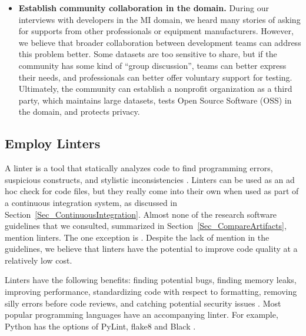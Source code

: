 \documentclass[final, 3p, times, authoryear]{elsarticle}
\begin{document}
\begin{itemize}
\item \textbf{Establish community collaboration in the domain.} During our
interviews with developers in the MI domain, we heard many stories of asking for
supports from other professionals or equipment manufacturers. However, we
believe that broader collaboration between development teams can address this
problem better. Some datasets are too sensitive to share, but if the community
has some kind of ``group discussion'', teams can better express their needs, and
professionals can better offer voluntary support for testing. Ultimately, the
community can establish a nonprofit organization as a third party, which
maintains large datasets, tests Open Source Software (OSS) in the domain, and
protects privacy. 

\end{itemize}

\subsection{Employ Linters} \label{Sec_Linters}

A linter is a tool that statically analyzes code to find programming errors,
suspicious constructs, and stylistic inconsistencies \citep{Wikipedia2022_Lint}.
Linters can be used as an ad hoc check for code files, but they really come into
their own when used as part of a continuous integration system, as discussed in
Section~\ref{Sec_ContinuousIntegration}. Almost none of the research software
guidelines that we consulted, summarized in Section~\ref{Sec_CompareArtifacts},
mention linters.  The one exception is \citet{ThielEtAl2020}.  Despite the lack
of mention in the guidelines, we believe that linters have the potential to
improve code quality at a relatively low cost.  

Linters have the following benefits: finding potential bugs, finding memory
leaks, improving performance, standardizing code with respect to formatting,
removing silly errors before code reviews, and catching potential security
issues \citep{SourceLevel2022_Lint}. Most popular programming languages have an
accompanying linter.  For example, Python has the options of PyLint, flake8 and
Black \citep{Zadka2018}.
\end{document}

